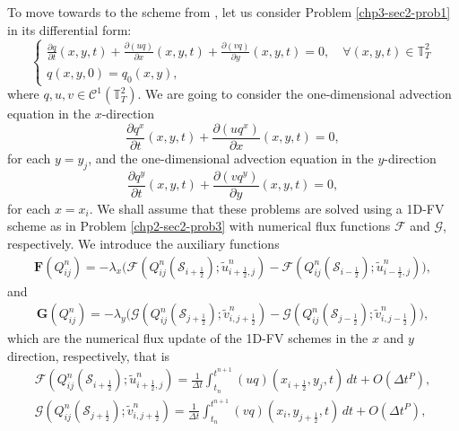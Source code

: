 To move towards to the scheme from  \citet{lin:1996}, let us consider Problem \ref{chp3-sec2-prob1}
in its differential form:
\begin{equation*}
	\label{chp3-adv2deq-xydir}
	\begin{cases}
		\frac{\partial q}{\partial t}(x, y, t) +
		\frac{\partial (uq)}{\partial x}(x, y, t) +
		\frac{\partial (vq)}{\partial y}(x, y, t) 
		= 0, \quad \forall (x, y, t) \in \mathbb{T}^2_T\\
		q(x,y,0) = q_0(x,y),
	\end{cases}
\end{equation*}
where $q,u,v \in \mathcal{C}^1{(\mathbb{T}^2_T)}$.
We are going to consider the one-dimensional advection equation in the $x$-direction
\begin{equation*}
	\label{chp3-adv2deq-xdir1}
	\frac{\partial q^x}{\partial t}(x, y, t) +
	\frac{\partial (uq^x)}{\partial x}(x, y, t)
	= 0,
\end{equation*}
for each $y = y_j$, and the one-dimensional advection equation in the $y$-direction
\begin{equation*}
	\label{chp3-adv2deq-ydir1}
	\frac{\partial q^y}{\partial t}(x, y, t) +
	\frac{\partial (vq^y)}{\partial y}(x, y, t)
	= 0,   
\end{equation*}
for each $x = x_i$. We shall assume that these problems are solved using a 1D-FV scheme as in Problem \ref{chp2-sec2-prob3}
with numerical flux functions $\mathcal{F}$ and $\mathcal{G}$, respectively. We introduce the auxiliary functions
\begin{align*}
	\mathbf{F}({{Q}_{ij}^n}) = -\lambda_x \big(\mathcal{F} (Q^n_{ij}(\mathcal{S}_{i+\frac{1}{2}}); \tilde{u}^n_{i+\frac{1}{2},j})- 
	\mathcal{F} (Q^n_{ij}(\mathcal{S}_{i-\frac{1}{2}}); \tilde{u}^n_{i-\frac{1}{2},j})\big),
\end{align*}
and
\begin{align*}
	\mathbf{G}({Q}_{ij}^n) = -\lambda_y \big( \mathcal{G} (Q^n_{ij}(\mathcal{S}_{j+\frac{1}{2}}); \tilde{v}^n_{i,j+\frac{1}{2}})- 
	\mathcal{G} (Q^n_{ij}(\mathcal{S}_{j-\frac{1}{2}}); \tilde{v}^n_{i,j-\frac{1}{2}}) \big),
\end{align*}
which are the numerical flux update of the 1D-FV schemes in the $x$ and $y$ direction, respectively, that is
\begin{align*}
	\mathcal{F} (Q^n_{ij}(\mathcal{S}_{i+\frac{1}{2}}); \tilde{u}^n_{i+\frac{1}{2},j}) = \frac{1}{\Delta t} \int_{t_n}^{t^{n+1}} (uq)(x_{i+\frac{1}{2}},y_j,t) \,dt + O(\Delta t^P)  ,\\
 	\mathcal{G} (Q^n_{ij}(\mathcal{S}_{j+\frac{1}{2}}); \tilde{v}^n_{i,j+\frac{1}{2}}) = \frac{1}{\Delta t} \int_{t_n}^{t^{n+1}} (vq)(x_i,y_{j+\frac{1}{2}},t) \,dt + O(\Delta t^P),
\end{align*}
